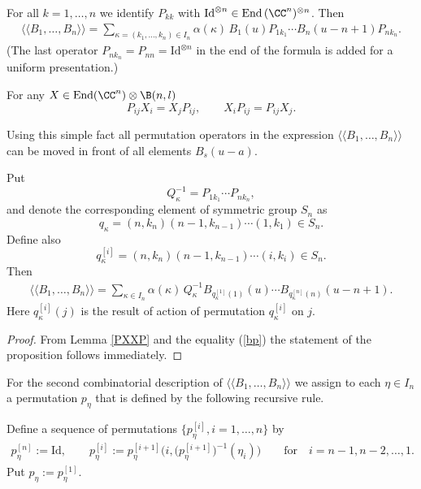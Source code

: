 For all $k=1,\dots, n$ we identify $P_{kk}$ with $\text{Id}^{\otimes n}\in \text{End}\, (\CC^n)^{\otimes n}$. Then
\begin{gather}\label{bp}
\langle \langle
B_1,\dots, B_n
\rangle \rangle =
 \sum _{\kappa=(k_1,\dots, k_n) \in I_n} \alpha(\kappa)\,B_1(u) P_{1k_1}
\cdots
B_{n}(u-n+1) P_{nk_n}.
\end{gather}
(The last operator $P_{n k_n}=P_{nn}=\text{Id}^{\otimes n}$ in the end of the formula  is  added  for a uniform presentation.)

\begin{lemma}\label{PXXP} For any $X\in \operatorname{End}( \CC^n) \otimes\B(n,l)$
\[
P_{ij}X_i=X_jP_{ij},
\qquad
X_iP_{ij}=P_{ij}X_j.
\]
\end{lemma}
Using this simple fact   all permutation operators  in the expression
$\langle \langle B_1,\dots, B_n\rangle \rangle $  can be moved in front of all elements $B_s(u-a)$.


\begin{proposition}\label{QA}
 Put
 \[
 Q^{-1}_{\kappa}=P_{1 k_1}\cdots P_{n k_n},
 \]
and denote the corresponding element of symmetric group $S_n$ as
\[
q_{\kappa}=(n,k_n)(n-1,k_{n-1})\cdots (1,k_1)\in S_n.
\]
Define also
\[
q_{\kappa}^{[i]}=(n,k_n)(n-1,k_{n-1})\cdots (i,k_i)\in S_n.
\]
Then
\begin{gather}\label{q2}
\langle \langle B_1,\dots, B_n\rangle \rangle
=\sum_{ \kappa \in I_n }\alpha{( \kappa)}\,Q^{-1}_{\kappa}B_{q_{\kappa}^{[1]}(1)}(u)\cdots B_{q_{\kappa}^{[n]}(n)}(u-n+1).
\end{gather}
Here $q_{\kappa}^{[i]}(j)$ is the result of action of permutation $q_{\kappa}^{[i]}$ on $j$.
\end{proposition}

\begin{proof}
From Lemma \ref{PXXP}  and the equality (\ref{bp}) the statement of the proposition  follows imme\-dia\-te\-ly.
\end{proof}


For the second  combinatorial description of $\langle \langle B_1,\dots, B_n\rangle \rangle $ we assign to  each $\eta\in I_n$ a permutation
 $p_\eta$ that is def\/ined by the following recursive rule.

  Def\/ine a sequence of permutations $\{p^{[i]}_\eta, i=1,\dots, n\}$ by
  \begin{gather*}%
    p^{[n]}_\eta :=\text{Id},\qquad
       p^{[i]}_\eta :=
       p^{[i+1]}_\eta \big(i,\big(p^{[i+1]}_\eta\big)^{-1}(\eta_i)\big)\qquad \text{for}\quad i=n-1, n-2,\dots, 1.
 \end{gather*}
Put $p_\eta:=p^{[1]}_\eta$.


